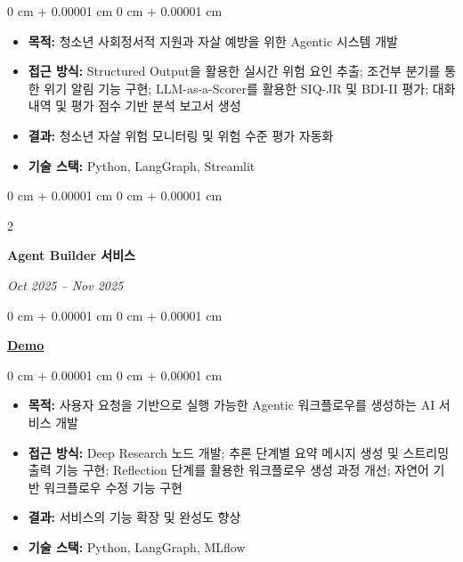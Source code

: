 \documentclass[10pt, letterpaper]{article}
\newenvironment{highlights}{
    \begin{itemize}[
        topsep=0.10 cm,
        parsep=0.10 cm,
        partopsep=0pt,
        itemsep=0pt,
        leftmargin=0 cm + 10pt
    ]
}{
    \end{itemize}
} %
\newenvironment{onecolentry}{
    \begin{adjustwidth}{
        0 cm + 0.00001 cm
    }{
        0 cm + 0.00001 cm
    }
}{
    \end{adjustwidth}
} %
\newenvironment{twocolentry}[2][]{
    \onecolentry
    \def\secondColumn{\textit{#2}}
    \setcolumnwidth{\fill, 4.5 cm}
    \begin{paracol}{2}
}{
    \switchcolumn \raggedleft \secondColumn
    \end{paracol}
    \endonecolentry
} %
\begin{document}
        \vspace{0.10 cm}
        \begin{onecolentry}
            \begin{highlights}
                \item \textbf{목적:} 청소년 사회정서적 지원과 자살 예방을 위한 Agentic 시스템 개발
                \item \textbf{접근 방식:} Structured Output을 활용한 실시간 위험 요인 추출; 조건부 분기를 통한 위기 알림 기능 구현; LLM-as-a-Scorer를 활용한 SIQ-JR 및 BDI-II 평가; 대화 내역 및 평가 점수 기반 분석 보고서 생성
                \item \textbf{결과:} 청소년 자살 위험 모니터링 및 위험 수준 평가 자동화
                \item \textbf{기술 스택:} Python, LangGraph, Streamlit
            \end{highlights}
        \end{onecolentry}

        \vspace{0.2 cm}
        \begin{twocolentry}{
            Oct 2025 -- Nov 2025
        }
            \textbf{Agent Builder 서비스}
        \end{twocolentry}
        \begin{onecolentry}
            \href{https://drive.google.com/file/d/1WF-cKsFLpeKYJn3NkBkesCdnmcinfLIx/view?usp=sharing}{\textbf{Demo}}
        \end{onecolentry}
            
        \vspace{0.10 cm}
        \begin{onecolentry}
            \begin{highlights}
                \item \textbf{목적:} 사용자 요청을 기반으로 실행 가능한 Agentic 워크플로우를 생성하는 AI 서비스 개발
                \item \textbf{접근 방식:} Deep Research 노드 개발; 추론 단계별 요약 메시지 생성 및 스트리밍 출력 기능 구현; Reflection 단계를 활용한 워크플로우 생성 과정 개선; 자연어 기반 워크플로우 수정 기능 구현
                \item \textbf{결과:} 서비스의 기능 확장 및 완성도 향상
                \item \textbf{기술 스택:} Python, LangGraph, MLflow
            \end{highlights}
        \end{onecolentry}
\end{document}
